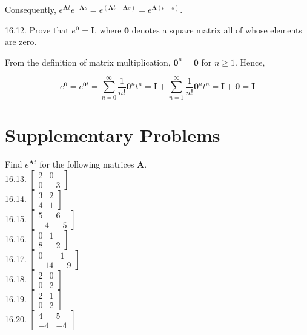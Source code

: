 \documentclass[10pt]{article}
\begin{document}
Consequently, $e^{\mathbf{A} t} e^{-\mathbf{A} s}=e^{(\mathbf{A} t-\mathbf{A} s)}=e^{\mathbf{A}(t-s)}$.

16.12. Prove that $e^{\mathbf{0}}=\mathbf{I}$, where $\mathbf{0}$ denotes a square matrix all of whose elements are zero.

From the definition of matrix multiplication, $\mathbf{0}^{n}=\mathbf{0}$ for $n \geq 1$. Hence,

$$
e^{\mathbf{0}}=e^{\mathbf{0} t}=\sum_{n=0}^{\infty} \frac{1}{n !} \mathbf{0}^{n} t^{n}=\mathbf{I}+\sum_{n=1}^{\infty} \frac{1}{n !} \mathbf{0}^{n} t^{n}=\mathbf{I}+\mathbf{0}=\mathbf{I}
$$

\section*{Supplementary Problems}
Find $e^{\mathbf{A} t}$ for the following matrices $\mathbf{A}$.\\
16.13. $\left[\begin{array}{rr}2 & 0 \\ 0 & -3\end{array}\right]$\\
16.14. $\left[\begin{array}{ll}3 & 2 \\ 4 & 1\end{array}\right]$\\
16.15. $\left[\begin{array}{rr}5 & 6 \\ -4 & -5\end{array}\right]$\\
16.16. $\left[\begin{array}{rr}0 & 1 \\ 8 & -2\end{array}\right]$\\
16.17. $\left[\begin{array}{cc}0 & 1 \\ -14 & -9\end{array}\right]$\\
16.18. $\left[\begin{array}{ll}2 & 0 \\ 0 & 2\end{array}\right]$\\
16.19. $\left[\begin{array}{ll}2 & 1 \\ 0 & 2\end{array}\right]$\\
16.20. $\left[\begin{array}{rr}4 & 5 \\ -4 & -4\end{array}\right]$\\
\end{document}
